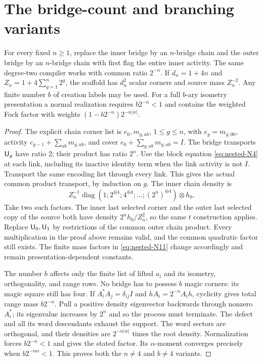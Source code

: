 \section{The bridge-count and branching variants}\label{nested:sec:variants}
\begin{corollary}
For every fixed $n\ge1$, replace the inner bridge by an $n$-bridge chain
and the outer bridge by an $n$-bridge chain with first flag the entire
inner activity. The same degree-two compiler works with common ratio
$2^{-n}$. If $d_n=1+4n$ and
$Z_n=1+4\sum_{g=1}^n2^g$, the scaffold has $d_n^2$ scalar corners and
source mass $Z_n^{-2}$. Any finite number $b$ of creation labels may
be used. For a full $b$-ary isometry presentation a normal realization
requires $b2^{-n}<1$ and contains the weighted Fock factor with weights
$(1-b2^{-n})2^{-n|w|}$.
\end{corollary}
\begin{proof}
The explicit chain corner list is $e_0,m_{g,ab}$, $1\le g\le n$,
with $e_g=m_{g,00}$, activity $e_{g-1}+\sum_{ab}m_{g,ab}$, and cover
$e_0+\sum_{g,ab}m_{g,ab}=I$. The bridge transports ${\mathsf U}_g$ have ratio
$2$; their product has ratio $2^n$. Use the block equation \eqref{eq:nested-N4} at
each link, including its inactive identity term when the link activity
is not $I$. Transport the same encoding list through every link.
This gives the actual common product transport, by induction on $g$.
The inner chain density is
\[
 Z_n^{-1}\operatorname{diag}(1;2^{\oplus4};4^{\oplus4};\ldots;
 (2^n)^{\oplus4})\otimes h_0.
\]
Take two such factors. The inner last selected corner and the outer
last selected copy of the source both have density $2^nh_0/Z_n^2$,
so the same $t$ construction applies. Replace ${\mathsf U}_0,{\mathsf U}_1$ by restrictions
of the common outer chain product. Every multiplication in the proof
above remains valid, and the common quadratic factor still exists.
The finite mass factors in \eqref{eq:nested-N11} change accordingly and remain
presentation-dependent constants.

The number $b$ affects only the finite list of lifted $a_i$ and its
isometry, orthogonality, and range rows. No bridge has to possess $b$
magic corners: its magic square still has four. If $A_i^*A_j=\delta_{ij}I$
and $hA_i=2^{-n}A_ih$, cyclicity gives total range mass $b2^{-n}$.
Pull a positive density eigenvector backwards through nonzero $A_i^*$;
its eigenvalue increases by $2^n$ and so the process must terminate.
The defect and all its word descendants exhaust the support. The word
sectors are orthogonal, and their densities are $2^{-n|w|}$ times
the root density. Normalization forces $b2^{-n}<1$ and gives the
stated factor. Its $\alpha$-moment converges precisely when
$b2^{-n\alpha}<1$. This proves both the $n\ne4$ and $b\ne4$ variants.
\end{proof}

